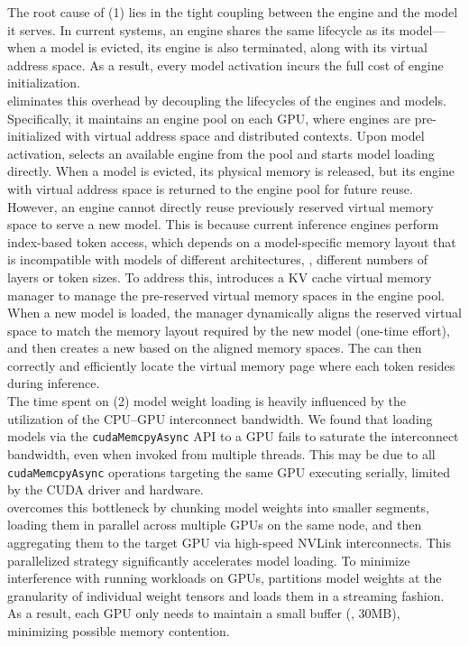 The root cause of (1) lies in the tight coupling between the engine and the model it serves. In current systems, an engine shares the same lifecycle as its model---when a model is evicted, its engine is also terminated, along with its virtual address space. As a result, every model activation incurs the full cost of engine initialization.
\\
\tool eliminates this overhead by decoupling the lifecycles of the engines and models. Specifically, it maintains an engine pool on each GPU, where engines are pre-initialized with virtual address space and distributed contexts. Upon model activation, \tool selects an available engine from the pool and starts model loading directly. When a model is evicted, its physical memory is released, but its engine with virtual address space is returned to the engine pool for future reuse.
\\
However, an engine cannot directly reuse previously reserved virtual memory space to serve a new model. 
This is because current inference engines perform index-based token access, which depends on a model-specific memory layout that is incompatible with models of different architectures, \eg, different numbers of layers or token sizes.
To address this, \tool introduces a KV cache virtual memory manager to manage the pre-reserved virtual memory spaces in the engine pool. When a new model is loaded, the manager dynamically aligns the reserved virtual space to match the memory layout required by the new model (one-time effort), and then creates a new \kvcached based on the aligned memory spaces.  
The \kvcached can then correctly and efficiently locate the virtual memory page where each token resides during inference. 
\\
The time spent on (2) model weight loading is heavily influenced by the utilization of the CPU–GPU interconnect bandwidth. 
We found that loading models \naively via the \texttt{cudaMemcpyAsync} API to a GPU fails to saturate the interconnect bandwidth, even when invoked from multiple threads. This may be due to all \texttt{cudaMemcpyAsync} operations targeting the same GPU executing serially, limited by the CUDA driver and hardware.
\\
\tool overcomes this bottleneck by chunking model weights into smaller segments, loading them in parallel across multiple GPUs on the same node, and then aggregating them to the target GPU via high-speed NVLink interconnects. This parallelized strategy significantly accelerates model loading.
To minimize interference with running workloads on GPUs, \tool partitions model weights at the granularity of individual weight tensors and loads them in a streaming fashion. As a result, each GPU only needs to maintain a small buffer (\eg, 30MB), minimizing possible memory contention.

